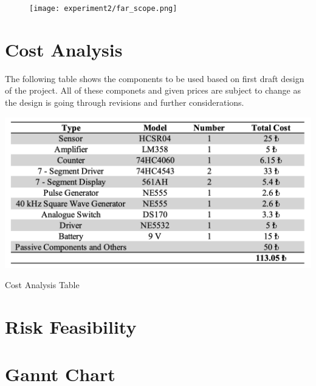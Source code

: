 \documentclass[12pt, a4paper]{article}
\begin{document}
        \begin{figure}[H]\centering
            \texttt{[image: experiment2/far\_scope.png]}
            \caption[]{}\label{fig:far_scope}
        \end{figure}


        





    
    \section{Cost Analysis}

        The following table shows the components to be used based on first draft design of the project. All of these componets and given prices are subject to change as the design is going through revisions and further considerations.
        
        \begin{table}[H]\centering
            \includegraphics[width=\textwidth]{CostAnalysis.png}
            \caption[]{Cost Analysis Table}\label{tab:cost}
        \end{table}

    \section{Risk Feasibility}

    \pagebreak
    \section{Gannt Chart}
\end{document}
